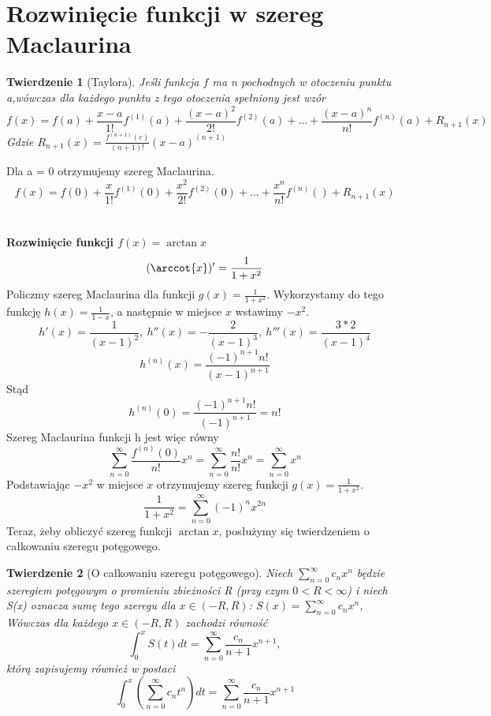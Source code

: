 \documentclass[11pt,a4paper]{article}
\newtheorem{twr}{Twierdzenie}
\begin{document}
    \section{Rozwinięcie funkcji w szereg Maclaurina}
    \begin{twr}[Taylora]
        Jeśli funkcja $f$ ma n pochodnych w otoczeniu punktu a,wówczas dla każdego punktu z tego otoczenia spełniony jest wzór
        \begin{displaymath}
            f(x) = f(a)+\frac{x-a}{1!}f^{(1)}(a)+\frac{(x-a)^{2}}{2!}f^{(2)}(a)+...+\frac{(x-a)^{n}}{n!}f^{(n)}(a)+R_{n+1}(x)
        \end{displaymath}
        Gdzie \begin{math} R_{n+1}(x) = \frac{f^{(n+1)}(c)}{(n+1)!}(x-a)^{(n+1)} \end{math}
    \end{twr}
    Dla a = 0 otrzymujemy szereg Maclaurina.
    \begin{displaymath}
        f(x) = f(0)+\frac{x}{1!}f^{(1)}(0)+\frac{x^{2}}{2!}f^{(2)}(0)+...+\frac{x^{n}}{n!}f^{(n)}()+R_{n+1}(x)
    \end{displaymath}
    \\\\
    \textbf{Rozwinięcie funkcji $f(x)=\arctan{x}$}      
    $$(\arccot{x})' = \frac{1}{1+x^2}$$
    Policzmy szereg Maclaurina dla funkcji $g(x)=\frac{1}{1+x^2}$. Wykorzystamy do tego funkcję $h(x)=\frac{1}{1-x}$, a następnie w miejsce $x$ wstawimy $-x^2$. \newline
    $$h'(x) = \frac{1}{(x-1)^2},\ h''(x) = -\frac{2}{(x-1)^3},\ h'''(x) = \frac{3*2}{(x-1)^4}$$\newline
    $$h^{(n)}(x) = \frac{(-1)^{n+1}n!}{(x-1)^{n+1}}$$
    Stąd
    $$h^{(n)}(0) = \frac{(-1)^{n+1}n!}{(-1)^{n+1}}=n!$$
    Szereg Maclaurina funkcji h jest więc równy
    $$\sum_{n=0}^{\infty}\frac{f^{(n)}(0)}{n!}x^{n} = \sum_{n=0}^{\infty}\frac{n!}{n!}x^{n} = \sum_{n=0}^{\infty}x^{n}$$
    Podstawiając $-x^{2}$ w miejsce $x$ otrzymujemy szereg funkcji $g(x)=\frac{1}{1+x^2}$.
    $$\frac{1}{1+x^2}=\sum_{n=0}^{\infty}(-1)^{n}x^{2n}$$
    Teraz, żeby obliczyć szereg funkcji $\arctan{x}$, posłużymy się twierdzeniem o całkowaniu szeregu potęgowego.
    \begin{twr}[O całkowaniu szeregu potęgowego]
        Niech $\sum_{n=0}^{\infty}c_nx^n$ będzie szeregiem potęgowym o promieniu zbieżności R (przy czym $0<R<\infty$) i niech S(x) oznacza sumę tego szeregu dla $x \in (-R,R)$: $S(x)=\sum_{n=0}^{\infty}c_nx^n$,\\
        Wówczas dla każdego $x \in (-R,R)$ zachodzi równość
        $$\int_0^xS(t)dt = \sum_{n=0}^{\infty}\frac{c_n}{n+1}x^{n+1},$$
        którą zapisujemy również w postaci
        $$\int_0^x(\sum_{n=0}^{\infty}c_nt^n)dt = \sum_{n=0}^{\infty}\frac{c_n}{n+1}x^{n+1}$$
    \end{twr}
\end{document}
